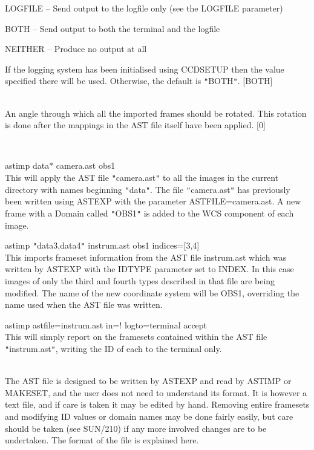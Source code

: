 \documentclass[twoside,11pt]{article}
\newcommand{\htmlref}[2]{#1}
\newcommand{\xref}[3]{#1}
\renewcommand{\_}{\texttt{\symbol{95}}}
\newcommand{\qt}[1]{{\tt "}#1{\tt "}}
\newcommand{\routine}[1]{{\sc #1}}
\newcommand{\xroutine}[1]{\htmlref{{\sc #1}}{#1}}
\newcommand{\sstexamples}[1]{
   \item[Examples:] \mbox{} \\
   \vspace{-3.5ex}
   \begin{description}
      #1
   \end{description}
}
\newcommand{\sstsubsection}[1]{ \item[{#1}] \mbox{} \\}
\newcommand{\sstexamplesubsection}[2]{\sloppy \item{\ssttt #1} \mbox{} \\ #2 }
\newcommand{\sstdiytopic}[2]{\item[#1:] \mbox{} \\[1.3ex] #2}
\newcommand{\sstitem}{\item}
\newcommand{\sstexamples}[1]{
      \item[Examples:] \\
      \begin{description}
         #1
      \end{description}
      \\
   }
\newcommand{\sstsubsection}[1]{\item[{#1}]}
\newcommand{\sstexamplesubsection}[2]{\item[{\ssttt #1}] #2}
\newcommand{\sstdiytopic}[2]{\item[{#1}] #2 }
\newcommand{\sstitem}{\item}
\begin{document}
{{{{            \sstitem
               LOGFILE   -- Send output to the logfile only (see the
                               LOGFILE parameter)

            \sstitem
               BOTH      -- Send output to both the terminal and the
                               logfile

            \sstitem
               NEITHER   -- Produce no output at all

         }
         If the logging system has been initialised using \xroutine{CCDSETUP}
         then the value specified there will be used. Otherwise, the
         default is \qt{BOTH}.
         [BOTH]
      }
      \sstsubsection{
         ROT = \_DOUBLE (Read)
      } {
         An angle through which all the imported frames should be
         rotated.  This rotation is done after the mappings in the AST
         file itself have been applied.
         [0]
      }
   }
   \sstexamples{
      \sstexamplesubsection{
         astimp data$*$ camera.ast obs1
      } {
         This will apply the AST file \qt{camera.ast} to all the images in
         the current directory with names beginning \qt{data}.  The file
         \qt{camera.ast} has previously been written using \xroutine{ASTEXP} 
         with the parameter ASTFILE=camera.ast.  A new frame with a Domain
         called \qt{OBS1} is added to the WCS component of each image.
      }
      \sstexamplesubsection{
         astimp \qt{data3,data4} instrum.ast obs1 indices=[3,4]
      } {
         This imports frameset information from the AST file
         instrum.ast which was written by ASTEXP with the IDTYPE
         parameter set to INDEX.  In this case images of only the third
         and fourth types described in that file are being modified.
         The name of the new coordinate system will be OBS1,
         overriding the name used when the AST file was written.
      }
      \sstexamplesubsection{
         astimp astfile=instrum.ast in=! logto=terminal accept
      } {
         This will simply report on the framesets contained within
         the AST file \qt{instrum.ast}, writing the ID of each to the
         terminal only.
      }
   }
   \sstdiytopic{
      AST file format
   } {
         The AST file is designed to be written by \xroutine{ASTEXP} and read by
         \routine{ASTIMP} or \xroutine{MAKESET}, and the user does not need to understand its format.
         It is however a text file, and if care is taken it may be
         edited by hand.  Removing entire framesets and modifying ID
         values or domain names may be done fairly easily, but care
         should be taken (see \xref{SUN/210}{sun210}{}) if any more involved changes
         are to be undertaken.  The format of the file is explained
         here.

}}
\end{document}
